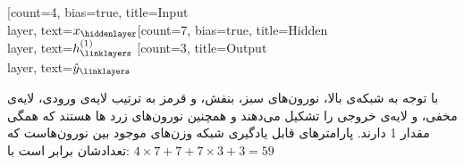 \documentclass{article}
\begin{document}
\section{}
\begin{latin}
\begin{neuralnetwork}[height=9]
    \newcommand{\x}[2]{$x_#2$}
    \newcommand{\y}[2]{$\hat{y}_#2$}
    \newcommand{\hfirst}[2]{\small $h^{(1)}_#2$}
    \newcommand{\hsecond}[2]{\small $h^{(2)}_#2$}
    [count=4, bias=true, title=Input\\layer, text=\x]
    \hiddenlayer[count=7, bias=true, title=Hidden\\layer, text=\hfirst] \linklayers
    \outputlayer[count=3, title=Output\\layer, text=\y] \linklayers
\end{neuralnetwork}
\end{latin}
با توجه به شبکه‌ی بالا، نورون‌های سبز، بنفش، و قرمز به ترتیب لایه‌ی ورودی، لایه‌ی مخفی، و لایه‌ی خروجی را تشکیل می‌دهند و همچنین نورون‌های زرد ها هستند که همگی مقدار 1 دارند. پارامترهای قابل یادگیری شبکه وزن‌های موجود بین نورون‌هاست که تعدادشان برابر است با:
$
4 \times 7 + 7 + 7 \times 3 + 3 = 59
$


\section{}


\section{}


\end{document}
